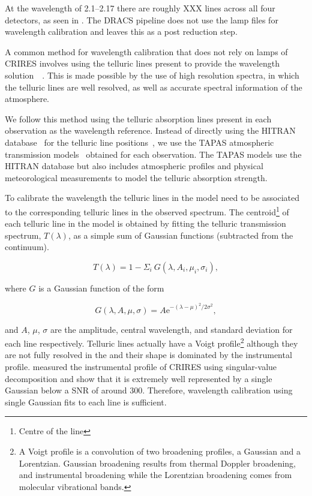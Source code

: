 At the wavelength of 2.1--2.17\um{} there are roughly XXX \thar{} lines across all four detectors, as seen in .
The {DRACS} pipeline does not use the \thar{} lamp files for wavelength calibration and leaves this as a post reduction step.

A common method for wavelength calibration that does not rely on \thar{} lamps of {CRIRES} involves using the telluric lines present to provide the wavelength solution~\citep[e.g.,][]{brogi_signature_2012,brogi_carbon_2014,dekok_detection_2013}{\red{}~\citep{piskorz_evidence_2016}}.
This is made possible by the use of high resolution spectra, in which the telluric lines are well resolved, as well as accurate spectral information of the atmosphere.

We follow this method using the telluric absorption lines present in each observation as the wavelength reference. Instead of directly using the {HITRAN} database~\citep{rothman_hitran2012_2013} for the telluric line positions~\citet[such as in][]{brogi_signature_2012,brogi_carbon_2014,dekok_detection_2013}, we use the {TAPAS} atmospheric transmission models~\citep{bertaux_tapas_2014} obtained for each observation. The {TAPAS} models use the {HITRAN} database but also includes atmospheric profiles and physical meteorological measurements to model the telluric absorption strength.

To calibrate the wavelength the telluric lines in the model need to be associated to the corresponding telluric lines in the observed spectrum. The centroid\footnote{Centre of the line} of each telluric line in the model is obtained by fitting the telluric transmission spectrum, \(T(\lambda)\), as a simple sum of Gaussian functions (subtracted from the continuum).

\begin{equation}
T(\lambda) = 1 - {\Sigma}_{i}\ G(\lambda, A_{i}, {\mu}_{i}, {\sigma}_{i}),
\end{equation}

where \(G\) is a Gaussian function of the form

\begin{equation}
G(\lambda, A, \mu, \sigma) = {A \textrm{e}}^{{-(\lambda-\mu)}^{2}/2\sigma^{2}},
\end{equation}

and \(A\), \(\mu\), \(\sigma\) are the amplitude, central wavelength, and standard deviation for each line respectively. Telluric lines actually have a Voigt profile\footnote{A Voigt profile is a convolution of two broadening profiles, a Gaussian and a Lorentzian. Gaussian broadening results from thermal Doppler broadening, and instrumental broadening while the Lorentzian broadening comes from molecular vibrational bands\citep{meier_art_2005}.} although they are not fully resolved in the \nir{} and their shape is dominated by the instrumental profile. \citet{seifahrt_synthesising_2010} measured the instrumental profile of {CRIRES} using singular-value decomposition and show that it is extremely well represented by a single Gaussian below a {SNR} of around 300. Therefore, wavelength calibration using single Gaussian fits to each line is sufficient.

